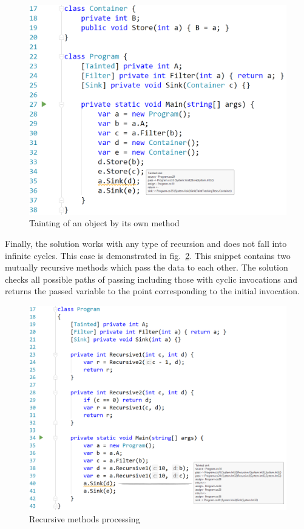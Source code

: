 \begin{figure}[h]
    \includegraphics[width=\linewidth]{screenshots/ContextSensitivity.png}
    \caption{Tainting of an object by its own method}
    \label{fig:ObjectTainting}
\end{figure}

Finally, the solution works with any type of recursion and does not fall into infinite cycles.
This case is demonstrated in fig.~\ref{fig:Recursion}.
This snippet contains two mutually recursive methods which pass the data to each other.
The solution checks all possible paths of passing including those with cyclic invocations and returns the passed variable to the point corresponding to the initial invocation.

\begin{figure}[h]
    \includegraphics[width=\linewidth]{screenshots/Recursion.png}
    \caption{Recursive methods processing}
    \label{fig:Recursion}
\end{figure}

